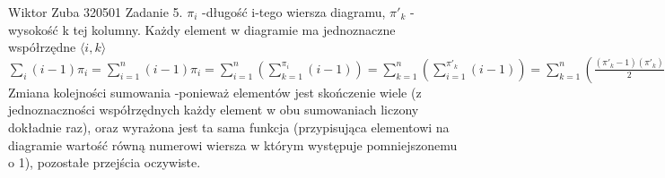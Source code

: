 \documentclass{article}
\begin{document}
Wiktor Zuba 320501
\newline
Zadanie 5.
\newline
\newline
$
\pi_i$ -długość i-tego wiersza diagramu, $\pi'_k$ -wysokość k tej kolumny.\newline
Każdy element w diagramie ma jednoznaczne współrzędne $\langle i,k\rangle$\newline
$
\sum\limits_{i}(i-1)\pi_i
=
\sum\limits_{i=1}^{n}(i-1)\pi_i
=
\sum\limits_{i=1}^{n}\left(\sum\limits_{k=1}^{\pi_i}(i-1)\right)
=
\sum\limits_{k=1}^{n}\left(\sum\limits_{i=1}^{\pi'_k}(i-1)\right)
=
\sum\limits_{k=1}^{n}\left(\frac{(\pi'_{k}-1)(\pi'_{k})}{2}\right)
=
\sum\limits_{k=1}^{n}{\pi'_{k}\choose 2}
=
\sum\limits_{i}{\pi'_{i}\choose 2}
$
Zmiana kolejności sumowania -ponieważ elementów jest skończenie wiele 
(z jednoznaczności współrzędnych każdy element w obu sumowaniach liczony dokładnie raz), oraz wyrażona jest ta sama funkcja
(przypisująca elementowi na diagramie wartość równą numerowi wiersza w którym występuje pomniejszonemu o 1),
pozostałe przejścia oczywiste.
\end{document}
